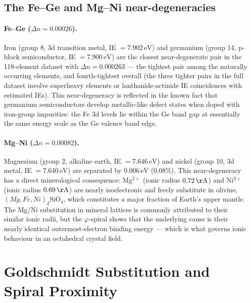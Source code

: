 \documentclass[11pt,a4paper]{article}
\theoremstyle{definition}
\theoremstyle{remark}
\newcommand{\vp}{\varphi}
\begin{document}
\subsection{The Fe--Ge and Mg--Ni near-degeneracies}

\paragraph{Fe--Ge ($\Delta n = 0.00026$).}
Iron (group 8, 3d transition metal, IE $= 7.902\,\mathrm{eV}$)
and germanium (group 14, p-block semiconductor,
IE $= 7.900\,\mathrm{eV}$) are the closest near-degenerate pair
in the 118-element dataset with $\Delta n = 0.000263$ --- the tightest
pair among the naturally occurring elements, and fourth-tightest overall
(the three tighter pairs in the full dataset involve superheavy elements
or lanthanide-actinide IE coincidences with estimated IEs).
This near-degeneracy is reflected in the known fact that germanium
semiconductors develop metallic-like defect states when doped with
iron-group impurities: the Fe 3d levels lie within the Ge band gap
at essentially the same energy scale as the Ge valence band edge.

\paragraph{Mg--Ni ($\Delta n = 0.00082$).}
Magnesium (group 2, alkaline earth, IE $= 7.646\,\mathrm{eV}$)
and nickel (group 10, 3d metal, IE $= 7.640\,\mathrm{eV}$)
are separated by $0.006\,\mathrm{eV}$ ($0.08\%$).
This near-degeneracy has a direct mineralogical consequence:
Mg$^{2+}$ (ionic radius $0.72\,\mathrm{\AA}$) and
Ni$^{2+}$ (ionic radius $0.69\,\mathrm{\AA}$) are nearly isoelectronic
and freely substitute in olivine,
$(Mg,Fe,Ni)_2\mathrm{SiO}_4$, which constitutes a major fraction of
Earth's upper mantle.  The Mg/Ni substitution in mineral lattices
is commonly attributed to their similar ionic radii, but the
$\vp$-spiral shows that the underlying cause is their nearly identical
outermost-electron binding energy --- which is what governs ionic
behaviour in an octahedral crystal field.

\section{Goldschmidt Substitution and Spiral Proximity}
\label{P11:sec:goldschmidt}
\end{document}
